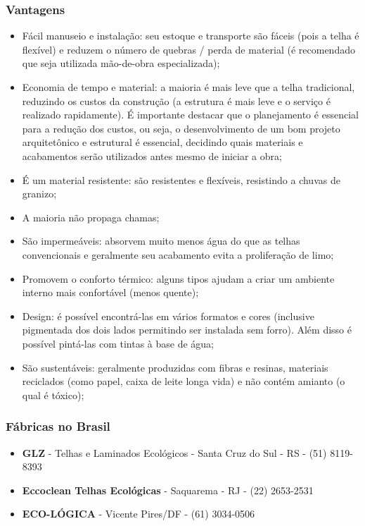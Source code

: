 \subsubsection*{\textbf{Vantagens}}

	\begin{itemize}

		\item Fácil manuseio e instalação: seu estoque e transporte são fáceis (pois a telha é flexível) e reduzem o número de quebras / perda de material (é recomendado que seja utilizada mão-de-obra especializada);
		\item Economia de tempo e material: a maioria é mais leve que a telha tradicional, reduzindo os custos da construção (a estrutura é mais leve e o serviço é realizado rapidamente). É importante destacar que o planejamento é essencial para a redução dos custos, ou seja, o desenvolvimento de um bom projeto arquitetônico e estrutural é essencial, decidindo quais materiais e acabamentos serão utilizados antes mesmo de iniciar a obra;
		\item É um material resistente: são resistentes e flexíveis, resistindo a chuvas de granizo;
		\item A maioria não propaga chamas;
		\item São impermeáveis: absorvem muito menos água do que as telhas convencionais e geralmente seu acabamento evita a proliferação de limo;
		\item Promovem o conforto térmico: alguns tipos ajudam a criar um ambiente interno mais confortável (menos quente);
		\item Design: é possível encontrá-las em vários formatos e cores (inclusive pigmentada dos dois lados permitindo ser instalada sem forro). Além disso é possível pintá-las com tintas à base de água;
		\item São sustentáveis: geralmente produzidas com fibras e resinas, materiais reciclados (como papel, caixa de leite longa vida) e não contém amianto (o qual é tóxico);
	
	\end{itemize}

\subsubsection*{\textbf{Fábricas no Brasil}}
	
	\begin{itemize}
	
		\item \textbf{GLZ} - Telhas e Laminados Ecológicos - Santa Cruz do Sul - RS - (51) 8119-8393

		\item \textbf{Eccoclean Telhas Ecológicas} - Saquarema - RJ - (22) 2653-2531

		\item \textbf{ECO-LÓGICA} - Vicente Pires/DF - (61) 3034-0506
	\end{itemize}

